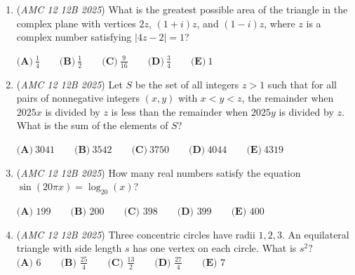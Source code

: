 \begin{enumerate}
	\item (\textit{AMC 12 12B 2025}) What is the greatest possible area of the triangle in the complex plane with vertices $2z$, $(1+i)z$, and $(1-i)z$, where $z$ is a complex number satisfying $|4z - 2| = 1$?


 $\textbf{(A)}~\frac 14 \qquad \textbf{(B)}~\frac 12 \qquad \textbf{(C)}~\frac{9}{16} \qquad \textbf{(D)}~\frac 34 \qquad \textbf{(E)}~1$


	\item (\textit{AMC 12 12B 2025}) Let $S$ be the set of all integers $z > 1$ such that for all pairs of nonnegative integers $(x, y)$ with $x < y < z$, the remainder when $2025x$ is divided by $z$ is less than the remainder when $2025y$ is divided by $z$. What is the sum of the elements of $S$?


 $\textbf{(A)}~3041 \qquad \textbf{(B)}~3542 \qquad \textbf{(C)}~3750 \qquad \textbf{(D)}~4044 \qquad \textbf{(E)}~4319$


	\item (\textit{AMC 12 12B 2025}) How many real numbers satisfy the equation $\sin(20\pi x) = \log_{20}(x)$?


 $\textbf{(A) } 199 \qquad \textbf{(B) } 200 \qquad \textbf{(C) } 398 \qquad \textbf{(D) } 399 \qquad \textbf{(E) } 400$


	\item (\textit{AMC 12 12B 2025}) Three concentric circles have radii $1,2,3$. An equilateral triangle with side length $s$ has one vertex on each circle. What is $s^2?$
$\textbf{(A) } 6 \qquad\textbf{(B) } \frac{25}{4} \qquad\textbf{(C) } \frac{13}{2} \qquad\textbf{(D) } \frac{27}{4} \qquad\textbf{(E) } 7$


\end{enumerate}